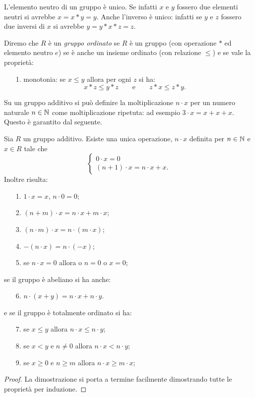   L'elemento neutro di un gruppo è unico. 
  Se infatti $x$ e $y$ fossero due elementi neutri 
  si avrebbe $x = x*y = y$. 
  Anche l'inverso è unico: infatti se $y$ e $z$ fossero 
  due inversi di $x$ si avrebbe $y = y * x * z = z$.
  
  \begin{definition}
    \label{def:gruppo_ordinato}%
    Diremo che $R$ è un \emph{gruppo ordinato}%
%
 se $R$ è un gruppo
    (con operazione $*$ ed elemento neutro $e$) 
    se è anche un insieme ordinato (con relazione $\le$)
    e se vale la proprietà:
    \begin{enumerate}
      \item[1.] monotonia: se $x\le y$ allora per ogni $z$ si ha:
       \[
       x*z \le y*z \qquad\text{e}\qquad z*x \le z*y.
       \] 
    \end{enumerate}
  \end{definition}

Su un gruppo additivo si può definire la moltiplicazione $n\cdot x$ per un numero 
naturale $n\in{\mathbb N}$ come moltiplicazione ripetuta:
ad esempio $3\cdot x = x + x + x$.
Questo è garantito dal seguente.
%
\begin{theorem}
  \label{th:addizione_ripetuta}%
Sia $R$ un gruppo additivo. 
Esiste una unica operazione, $n \cdot x$ definita per $n\in {\mathbb N}$ 
e $x\in R$ tale che
\[
\begin{cases}
  0\cdot x  = 0 \\
  (n+1) \cdot x = n\cdot x + x.
\end{cases}  
\]
Inoltre risulta:
\begin{enumerate}
  \item[1.] $1\cdot x = x$, $n\cdot 0 = 0$;
  \item[2.] $(n+m)\cdot x = n\cdot x + m\cdot x$; 
  \item[3.] $(n\cdot m)\cdot x = n\cdot (m\cdot x)$;
  \item[4.] $-(n\cdot x) = n\cdot(-x)$;
  \item[5.] se $n\cdot x = 0$ allora o $n=0$ o $x=0$;
\end{enumerate}
se il gruppo è abeliano si ha anche:
\begin{enumerate}
\item[6.] $n\cdot(x+y) = n\cdot x + n\cdot y$.
\end{enumerate}
e se il gruppo è totalmente ordinato si ha:
\begin{enumerate}
  \item[7.] se $x \le y$ allora $n\cdot x \le n\cdot y$;
  \item[8.] se $x < y$ e $n \neq 0$ allora $n\cdot x < n\cdot y$;
  \item[9.] se $x\ge 0$ e $n\ge m$ allora $n\cdot x\ge m\cdot x$;
\end{enumerate}
\end{theorem}
%
\begin{proof}
La dimostrazione si porta a termine facilmente dimostrando tutte le proprietà 
per induzione.
\end{proof}


